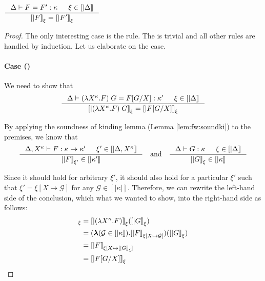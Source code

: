 \begin{lemma} \label{lem:fw:soundtyeq}
$ \inference{\Delta |- F = F' : \kappa & \xi\in[|\Delta|]}
        {[|F|]_\xi = [|F'|]_\xi} $
\end{lemma}
\begin{proof}
The only interesting case is the  rule.
The  is trivial and all other rules are handled by induction.
Let us elaborate on the  case.

\paragraph{Case ()} We need to show that
\[ \inference
        { \Delta |- (\l X^\kappa.F)\;G = F[G/X] : \kappa' & \xi\in[|\Delta|] }
        { [| (\l X^\kappa.F)\;G |]_\xi = [| F[G/X] |]_\xi }
\]

By applying the soundness of kinding lemma (Lemma \ref{lem:fw:soundki})
to the premises, we know that
\[ \inference
        {\Delta,X^\kappa |- F : \kappa -> \kappa' & \xi'\in[|\Delta,X^\kappa|]}
        {[|F|]_{\xi'} \in [|\kappa'|]}
\quad\text{and}\quad
   \inference{\Delta |- G : \kappa & \xi\in[|\Delta|]}{[|G|]_\xi \in [|\kappa|]}
\]

Since it should hold for arbitrary $\xi'$, it should also hold for
a particular $\xi'$ such that $\xi'=\xi[X\mapsto\mathcal{G}]$
for any $\mathcal{G} \in [|\kappa|]$. Therefore, we can rewrite
the left-hand side of the conclusion, which what we wanted to show,
into the right-hand side as follows:
\begin{align*}
[| (\l X^\kappa.F)\;G |]_\xi
&=[|(\l X^\kappa.F)|]_\xi ([|G|]_\xi) \\
&=(\bbl(\mathcal{G}\in[|\kappa|]).[|F|]_{\xi[X\mapsto\mathcal{G}]})([|G|]_\xi)\\
&=[|F|]_{\xi[X\mapsto[|G|]_\xi]} \\
&=[|F[G/X]|]_\xi
\end{align*}
\end{proof}

